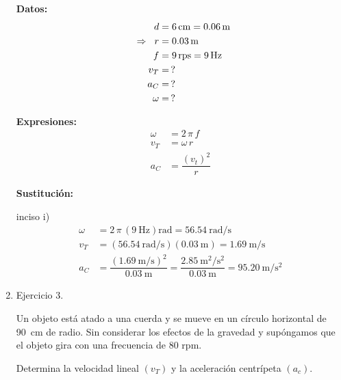 \documentclass[12pt]{article}
\begin{document}
\begin{enumerate}
\vspace*{0.5cm}
\begin{minipage}[t]{0.4\linewidth}
\textbf{Datos:}
\begin{align*}
d &= \SI{6}{\centi\meter} = \SI{0.06}{\meter} \\
\hspace{0.2cm} \Rightarrow \hspace{0.2cm} r &= \SI{0.03}{\meter} \\
f &= 9 \, \text{rps} = \SI{9}{\hertz} \\
v_{T} &= \, ? \\
a_{C} &= \, ? \\
\omega &= \, ?
\end{align*}
\end{minipage}
\begin{minipage}[t]{0.4\linewidth}
\textbf{Expresiones:}
\begin{align*}
\omega &= 2 \, \pi \, f \\
v_{T} &= \omega \, r \\
a_{C} &= \dfrac{(v_{t})^{2}}{r}
\end{align*}
\end{minipage}

\textbf{Sustitución:}

inciso i) 
\begin{align*}
\omega &= 2 \, \pi \, \left( \SI{9}{\hertz} \right) \unit{\radian} = \SI[per-mode=fraction]{56.54}{\radian\per\second} \\[0.5em]
v_{T} &= \left( \SI[per-mode=fraction]{56.54}{\radian\per\second} \right) (\SI{0.03}{\meter}) = \SI[per-mode=fraction]{1.69}{\meter\per\second} \\[0.5em]
a_{C} &= \dfrac{\displaystyle \left( \SI[per-mode=fraction]{1.69}{\meter\per\second} \right)^{2}}{\SI{0.03}{\meter}} = \dfrac{\displaystyle \SI[per-mode=fraction]{2.85}{\square\meter\per\square\second}}{\SI{0.03}{\meter}} = \SI[per-mode=fraction]{95.20}{\meter\per\square\second}
\end{align*}


\item Ejercicio 3.

Un objeto está atado a una cuerda y se mueve en un círculo horizontal de \SI{90}{\centi\meter} de radio. Sin considerar los efectos de la gravedad y supóngamos que el objeto gira con una frecuencia de 80 rpm.

Determina la velocidad lineal $(v_{T})$ y la aceleración centrípeta $(a_{c})$.


\end{enumerate}
\end{document}
